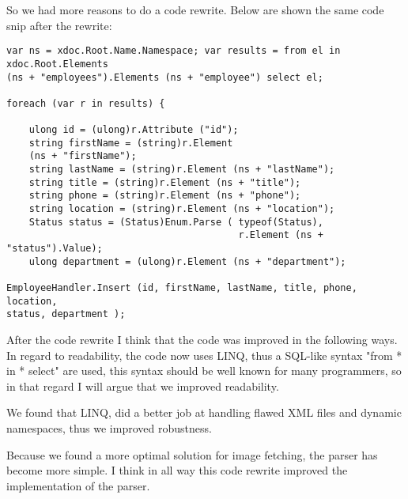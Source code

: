     So we had more reasons to do a code rewrite. 
    Below are shown the same code snip after the rewrite:
    \begin{lstlisting}
var ns = xdoc.Root.Name.Namespace; var results = from el in xdoc.Root.Elements
(ns + "employees").Elements (ns + "employee") select el;

foreach (var r in results) {

    ulong id = (ulong)r.Attribute ("id"); 
    string firstName = (string)r.Element
    (ns + "firstName");
    string lastName = (string)r.Element (ns + "lastName");
    string title = (string)r.Element (ns + "title"); 
    string phone = (string)r.Element (ns + "phone"); 
    string location = (string)r.Element (ns + "location"); 
    Status status = (Status)Enum.Parse ( typeof(Status), 
                                         r.Element (ns + "status").Value);
    ulong department = (ulong)r.Element (ns + "department");

EmployeeHandler.Insert (id, firstName, lastName, title, phone, location,
status, department );
    \end{lstlisting}
    After the code rewrite I think that the code was improved in the following
    ways. In regard to readability, the code now uses LINQ, thus a SQL-like
    syntax "from * in * select" are used, this syntax should be well known for
    many programmers, so in that regard I will argue that we improved
    readability.
    
    We found that LINQ, did a better job at handling flawed XML files and
    dynamic namespaces, thus we improved robustness.
    
    Because we found a more optimal solution for image fetching, the parser
    has become more simple. I think in all way this code rewrite improved the
    implementation of the parser.

